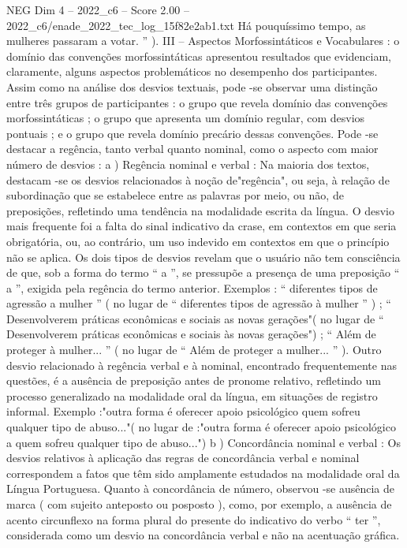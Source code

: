 \begin{textsample}{NEG Dim 4 – 2022\_c6 – Score 2.00 – 2022\_c6/enade\_2022\_tec\_log\_15f82e2ab1.txt}
Há pouquíssimo tempo, as mulheres passaram a votar. ” ).
III – Aspectos Morfossintáticos e Vocabulares : o domínio das convenções morfossintáticas apresentou resultados que evidenciam, claramente, alguns aspectos problemáticos no desempenho dos participantes.
Assim como na análise dos desvios textuais, pode -se observar uma distinção entre três grupos de participantes : o grupo que revela domínio das convenções morfossintáticas ; o grupo que apresenta um domínio regular, com desvios pontuais ; e o grupo que revela domínio precário dessas convenções.
Pode -se destacar a regência, tanto verbal quanto nominal, como o aspecto com maior número de desvios : a ) Regência nominal e verbal : Na maioria dos textos, destacam -se os desvios relacionados à noção de"regência", ou seja, à relação de subordinação que se estabelece entre as palavras por meio, ou não, de preposições, refletindo uma tendência na modalidade escrita da língua.
O desvio mais frequente foi a falta do sinal indicativo da crase, em contextos em que seria obrigatória, ou, ao contrário, um uso indevido em contextos em que o princípio não se aplica.
Os dois tipos de desvios revelam que o usuário não tem consciência de que, sob a forma do termo “ a ”, se pressupõe a presença de uma preposição “ a ”, exigida pela regência do termo anterior.
Exemplos : “ diferentes tipos de agressão a mulher ” ( no lugar de “ diferentes tipos de agressão à mulher ” ) ; “ Desenvolverem práticas econômicas e sociais as novas gerações"( no lugar de “ Desenvolverem práticas econômicas e sociais às novas gerações") ; “ Além de proteger à mulher... ” ( no lugar de “ Além de proteger a mulher... ” ).
Outro desvio relacionado à regência verbal e à nominal, encontrado frequentemente nas questões, é a ausência de preposição antes de pronome relativo, refletindo um processo generalizado na modalidade oral da língua, em situações de registro informal.
Exemplo :"outra forma é oferecer apoio psicológico quem sofreu qualquer tipo de abuso..."( no lugar de :"outra forma é oferecer apoio psicológico a quem sofreu qualquer tipo de abuso...") b ) Concordância nominal e verbal : Os desvios relativos à aplicação das regras de concordância verbal e nominal correspondem a fatos que têm sido amplamente estudados na modalidade oral da Língua Portuguesa.
Quanto à concordância de número, observou -se ausência de marca ( com sujeito anteposto ou posposto ), como, por exemplo, a ausência de acento circunflexo na forma plural do presente do indicativo do verbo “ ter ”, considerada como um desvio na concordância verbal e não na acentuação gráfica.

\end{textsample}
